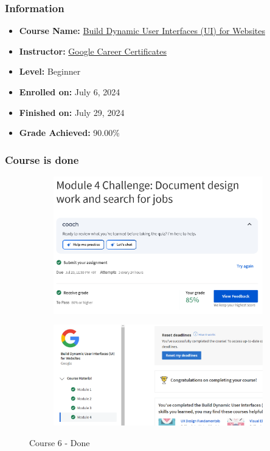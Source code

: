 \subsubsection{Information}
\begin{itemize}
	\item \textbf{Course Name:} \href{https://www.coursera.org/learn/responsive-web-design-adobe-xd}{Build Dynamic User Interfaces (UI) for Websites}
	\item \textbf{Instructor:} \href{https://www.coursera.org/instructor/google-career-certificates}{Google Career Certificates}
	\item \textbf{Level:} Beginner
	\item \textbf{Enrolled on:} July 6, 2024
	\item \textbf{Finished on:} July 29, 2024
	\item \textbf{Grade Achieved:} 90.00\%
\end{itemize}

\subsubsection{Course is done}
\begin{figure}[!ht]
	\centering
	\begin{subfigure}{0.75\textwidth}
		\centering
		\includegraphics[width=\textwidth]{imgs/Course6-M4.png}
	\end{subfigure}
	\hfill
	\begin{subfigure}{0.75\textwidth}
		\centering
		\includegraphics[width=\textwidth]{imgs/Course6-Done.png}
	\end{subfigure}
	\caption{Course 6 - Done}
\end{figure}

